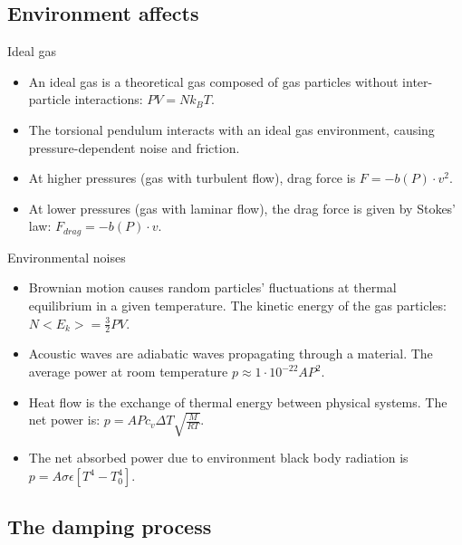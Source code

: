 \documentclass{beamer}
\begin{document}
\subsection{Environment affects}
\begin{frame}{Ideal gas}
	\begin{itemize}
		\item An ideal gas is a theoretical gas composed of gas particles without inter-particle interactions: $PV =  N k_B T $.
		\item The torsional pendulum interacts with an ideal gas environment, causing pressure-dependent noise and friction.
		\pause
		\item At higher pressures (gas with turbulent flow), drag force is $F = -b(P)\cdot v^2 $.
		\item At lower pressures (gas with laminar flow), the drag force is given by Stokes' law: $F_{drag} =  -b(P)\cdot v$.
		
	\end{itemize}
\end{frame}

\begin{frame}{Environmental noises}
	\begin{itemize}
		
		\item Brownian motion causes random particles' fluctuations at thermal equilibrium in a given temperature. The kinetic energy of the gas particles: $ N<E_k> = \frac{3}{2} PV$.
		\item Acoustic waves are adiabatic waves propagating through a material. The average power at room temperature $p  \approx 1\cdot10^{-22}AP^2$.
		\item Heat flow is the exchange of thermal energy between physical systems. The net power is: $p= A P c_v \Delta T \sqrt{\frac{M}{RT}} $.
		\pause
		\item The net absorbed power due to environment black body radiation is $p= A \sigma\epsilon[ T^4- T_0^4]$.
		
	\end{itemize}
\end{frame}

\subsection{The damping process}
\end{document}
